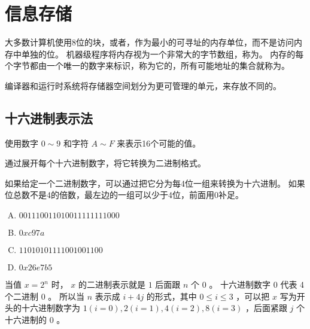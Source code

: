 
\section{信息存储}
{
    大多数计算机使用8位的块，或者，作为最小的可寻址的内存单位，而不是访问内存中单独的位。
    机器级程序将内存视为一个非常大的字节数组，称为。
    内存的每个字节都由一个唯一的数字来标识，称为它的，所有可能地址的集合就称为。

    编译器和运行时系统将存储器空间划分为更可管理的单元，来存放不同的。

    \subsection{十六进制表示法}
    {
        使用数字 $0 \sim 9$ 和字符 $A \sim F$ 来表示16个可能的值。

        通过展开每个十六进制数字，将它转换为二进制格式。

        如果给定一个二进制数字，可以通过把它分为每4位一组来转换为十六进制。
        如果位总数不是4的倍数，最左边的一组可以少于4位，前面用0补足。

        \begin{practicec}
            \begin{enumerate}[A.]
                \item $0011 1001 1010 0111 1111 1000$
                \item $0xc97a$
                \item $1101 0101 1110 0100 1100$
                \item $0x26e7b5$
            \end{enumerate}
        \end{practicec}

        当值 $x = 2^n$ 时， $x$ 的二进制表示就是 $1$ 后面跟 $n$ 个 $0$ 。
        十六进制数字 $0$ 代表 4个二进制 $0$ 。
        所以当 $n$ 表示成 $i + 4j$ 的形式，其中 $0 \leq i \leq 3$ ，可以把 $x$ 写为开头的十六进制数字为 $1(i = 0), 2(i = 1), 4(i = 2), 8(i = 3)$ ，后面紧跟 $j$ 个十六进制的 $0$ 。

}}
